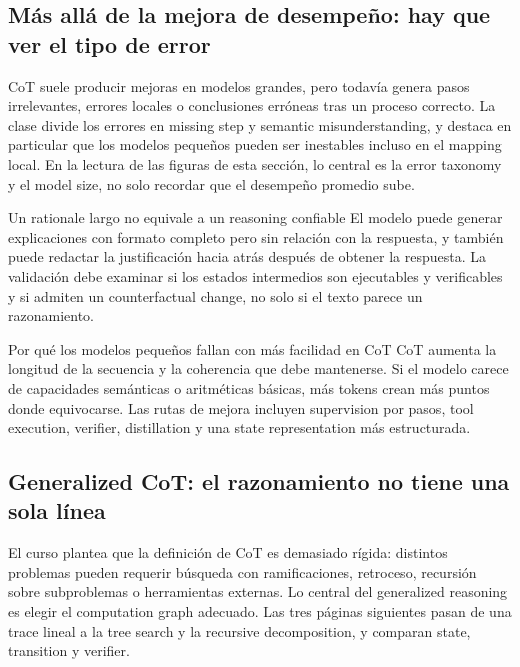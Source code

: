 \subsection{Más allá de la mejora de desempeño: hay que ver el tipo de error}

CoT suele producir mejoras en modelos grandes, pero todavía genera pasos irrelevantes, errores locales o conclusiones erróneas tras un proceso correcto. La clase divide los errores en missing step y semantic misunderstanding, y destaca en particular que los modelos pequeños pueden ser inestables incluso en el mapping local. En la lectura de las figuras de esta sección, lo central es la error taxonomy y el model size, no solo recordar que el desempeño promedio sube.


\begin{warningbox}{Un rationale largo no equivale a un reasoning confiable}
El modelo puede generar explicaciones con formato completo pero sin relación con la respuesta, y también puede redactar la justificación hacia atrás después de obtener la respuesta. La validación debe examinar si los estados intermedios son ejecutables y verificables y si admiten un counterfactual change, no solo si el texto parece un razonamiento.
\end{warningbox}


\begin{knowledgebox}{Por qué los modelos pequeños fallan con más facilidad en CoT}
CoT aumenta la longitud de la secuencia y la coherencia que debe mantenerse. Si el modelo carece de capacidades semánticas o aritméticas básicas, más tokens crean más puntos donde equivocarse. Las rutas de mejora incluyen supervision por pasos, tool execution, verifier, distillation y una state representation más estructurada.
\end{knowledgebox}

\subsection{Generalized CoT: el razonamiento no tiene una sola línea}

El curso plantea que la definición de CoT es demasiado rígida: distintos problemas pueden requerir búsqueda con ramificaciones, retroceso, recursión sobre subproblemas o herramientas externas. Lo central del generalized reasoning es elegir el computation graph adecuado. Las tres páginas siguientes pasan de una trace lineal a la tree search y la recursive decomposition, y comparan state, transition y verifier.

